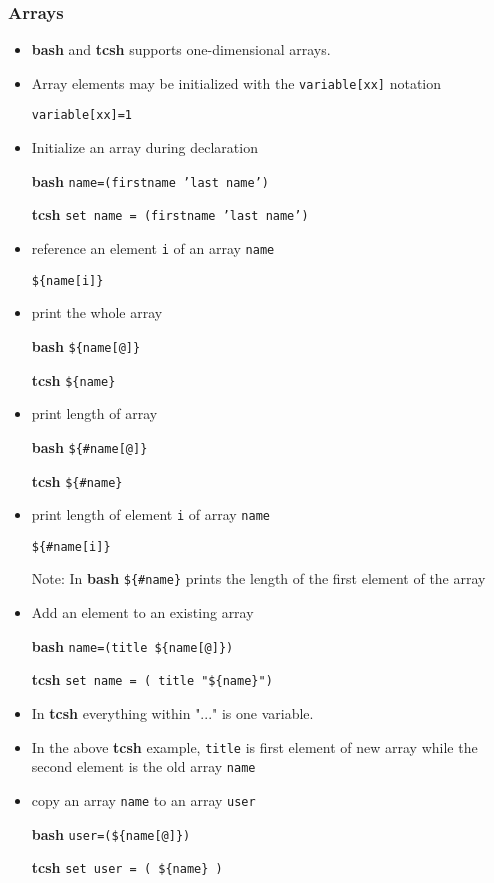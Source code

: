 \documentclass[slidestop,mathserif,compress,xcolor=svgnames]{beamer}
\begin{document}
\begin{frame}
  \frametitle{\small Arrays}
  \begin{itemize}
    \item \textbf{bash} and \textbf{tcsh} supports one-dimensional arrays.
    \item Array elements may be initialized with the \texttt{variable[xx]} notation
    \item[] \texttt{variable[xx]=1}
    \item Initialize an array during declaration
    \item[\textbf{bash}] \texttt{name=(firstname 'last name')}
    \item[\textbf{tcsh}] \texttt{set name = (firstname 'last name')}
    \item reference an element \texttt{i} of an array \texttt{name}
    \item[] \texttt{\$\{name[i]\}}
    \item print the whole array
    \item[\textbf{bash}] \texttt{\$\{name[@]\}}
    \item[\textbf{tcsh}] \texttt{\$\{name\}}
    \item print length of array
    \item[\textbf{bash}] \texttt{\$\{\#name[@]\}}
    \item[\textbf{tcsh}] \texttt{\$\{\#name\}}
    \item print length of element \texttt{i} of array \texttt{name}
    \item[] \texttt{\$\{\#name[i]\}}
    \item[] Note: In \textbf{bash} \texttt{\$\{\#name\}} prints the length of the first element of the array
    \item Add an element to an existing array
    \item[\textbf{bash}] \texttt{name=(title \$\{name[@]\})}
    \item[\textbf{tcsh}] \texttt{set name = ( title  "\$\{name\}")}
    \item In \textbf{tcsh} everything within "..." is one variable.
    \item In the above \textbf{tcsh} example, \texttt{title} is first element of new array while the second element is the old array \texttt{name}
    \item copy an array \texttt{name} to an array \texttt{user}
    \item[\textbf{bash}] \texttt{user=(\$\{name[@]\})}
    \item[\textbf{tcsh}] \texttt{set user = ( \$\{name\} )}

\end{itemize}
\end{frame}
\end{document}
